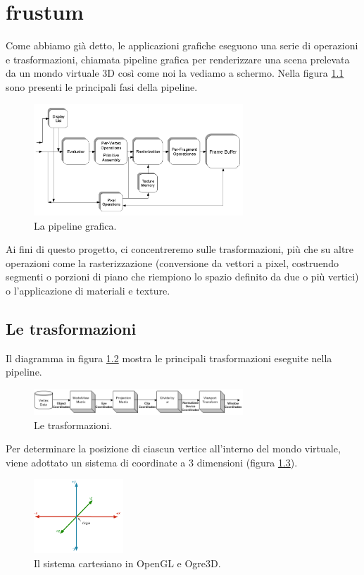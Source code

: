 
\chapter{frustum}

Come abbiamo già detto, le applicazioni grafiche eseguono una serie di operazioni e trasformazioni, chiamata pipeline grafica per renderizzare una scena prelevata da un mondo virtuale 3D così come noi la vediamo a schermo. Nella figura \ref{pipeline} sono presenti le principali fasi della pipeline.

\begin{figure}[htbp]
\centering
\includegraphics[width=0.7\textwidth]{images/frustum/opengl-pipeline.png}
\caption{La pipeline grafica.\label{pipeline}}
\end{figure}

Ai fini di questo progetto, ci concentreremo sulle trasformazioni, più che su altre operazioni come la rasterizzazione (conversione da vettori a pixel, costruendo segmenti o porzioni di piano che riempiono lo spazio definito da due o più vertici) o l'applicazione di materiali e texture.

\section{Le trasformazioni}
Il diagramma in figura \ref{trans-pipe} mostra le principali trasformazioni eseguite nella pipeline.

\begin{figure}[htbp]
\centering
\includegraphics[width=0.7\textwidth]{images/frustum/transform-pipeline.png}
\caption{Le trasformazioni.\label{trans-pipe}}
\end{figure}

Per determinare la posizione di ciascun vertice all'interno del mondo virtuale, viene adottato un sistema di coordinate a 3 dimensioni (figura \ref{cartesian}).
\begin{figure}[htbp]
\centering
\includegraphics[width=0.3\textwidth]{images/frustum/cartesian.png}
\caption{Il sistema cartesiano in OpenGL e Ogre3D.\label{cartesian}}
\end{figure}

